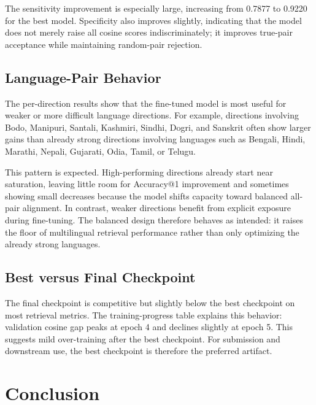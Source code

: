 \documentclass[12pt, a4paper]{article}
\begin{document}
The sensitivity improvement is especially large, increasing from 0.7877 to 0.9220 for the best model. Specificity also improves slightly, indicating that the model does not merely raise all cosine scores indiscriminately; it improves true-pair acceptance while maintaining random-pair rejection.

\subsection{Language-Pair Behavior}

The per-direction results show that the fine-tuned model is most useful for weaker or more difficult language directions. For example, directions involving Bodo, Manipuri, Santali, Kashmiri, Sindhi, Dogri, and Sanskrit often show larger gains than already strong directions involving languages such as Bengali, Hindi, Marathi, Nepali, Gujarati, Odia, Tamil, or Telugu.

This pattern is expected. High-performing directions already start near saturation, leaving little room for Accuracy@1 improvement and sometimes showing small decreases because the model shifts capacity toward balanced all-pair alignment. In contrast, weaker directions benefit from explicit exposure during fine-tuning. The balanced design therefore behaves as intended: it raises the floor of multilingual retrieval performance rather than only optimizing the already strong languages.

\subsection{Best versus Final Checkpoint}

The final checkpoint is competitive but slightly below the best checkpoint on most retrieval metrics. The training-progress table explains this behavior: validation cosine gap peaks at epoch 4 and declines slightly at epoch 5. This suggests mild over-training after the best checkpoint. For submission and downstream use, the best checkpoint is therefore the preferred artifact.

\newpage

\section{Conclusion}
\end{document}
